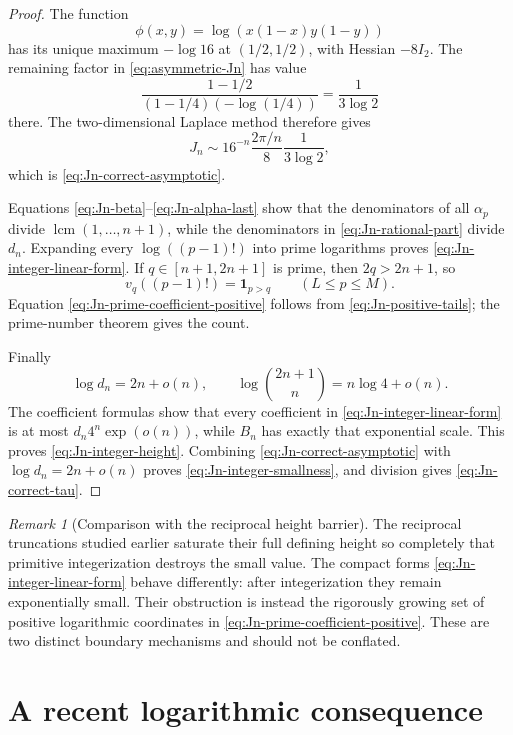 \documentclass[11pt]{article}
\theoremstyle{definition}
\theoremstyle{remark}
\newtheorem{remark}[theorem]{Remark}
\begin{document}
\begin{proof}
The function
\[
 \phi(x,y)=\log(x(1-x)y(1-y))
\]
has its unique maximum \(-\log16\) at \((1/2,1/2)\), with Hessian
\(-8I_2\).  The remaining factor in \eqref{eq:asymmetric-Jn} has value
\[
 \frac{1-1/2}{(1-1/4)(-\log(1/4))}=\frac1{3\log2}
\]
there.  The two-dimensional Laplace method therefore gives
\[
 J_n\sim16^{-n}\frac{2\pi/n}{8}\frac1{3\log2},
\]
which is \eqref{eq:Jn-correct-asymptotic}.

Equations \eqref{eq:Jn-beta}--\eqref{eq:Jn-alpha-last} show that the
denominators of all \(\alpha_p\) divide
\(\operatorname{lcm}(1,\ldots,n+1)\), while the denominators in
\eqref{eq:Jn-rational-part} divide \(d_n\).  Expanding every
\(\log((p-1)!)\) into prime logarithms proves
\eqref{eq:Jn-integer-linear-form}.  If \(q\in[n+1,2n+1]\) is prime, then
\(2q>2n+1\), so
\[
 v_q((p-1)!)=\mathbf1_{p>q}\qquad(L\le p\le M).
\]
Equation \eqref{eq:Jn-prime-coefficient-positive} follows from
\eqref{eq:Jn-positive-tails}; the prime-number theorem gives the count.

Finally
\[
 \log d_n=2n+o(n),\qquad
 \log\binom{2n+1}{n}=n\log4+o(n).
\]
The coefficient formulas show that every coefficient in
\eqref{eq:Jn-integer-linear-form} is at most
\(d_n4^n\exp(o(n))\), while \(B_n\) has exactly that exponential scale.
This proves \eqref{eq:Jn-integer-height}.  Combining
\eqref{eq:Jn-correct-asymptotic} with \(\log d_n=2n+o(n)\) proves
\eqref{eq:Jn-integer-smallness}, and division gives
\eqref{eq:Jn-correct-tau}.
\end{proof}

\begin{remark}[Comparison with the reciprocal height barrier]
The reciprocal truncations studied earlier saturate their full defining
height so completely that primitive integerization destroys the small
value.  The compact forms \eqref{eq:Jn-integer-linear-form} behave
differently: after integerization they remain exponentially small.  Their
obstruction is instead the rigorously growing set of positive logarithmic
coordinates in \eqref{eq:Jn-prime-coefficient-positive}.  These are two
distinct boundary mechanisms and should not be conflated.
\end{remark}

\section{A recent logarithmic consequence}\label{sec:log}
\end{document}
